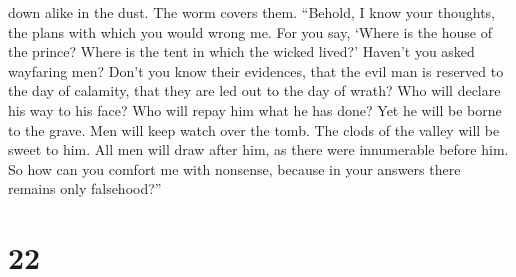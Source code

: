 down alike in the dust. The worm covers them.  ``Behold,
I know your thoughts, the plans with which you would wrong me.
 For you say, `Where is the house of the prince? Where is
the tent in which the wicked lived?'  Haven't you asked
wayfaring men? Don't you know their evidences,  that the
evil man is reserved to the day of calamity, that they are led out to
the day of wrath?  Who will declare his way to his face?
Who will repay him what he has done?  Yet he will be
borne to the grave. Men will keep watch over the tomb. 
The clods of the valley will be sweet to him. All men will draw after
him, as there were innumerable before him.  So how can
you comfort me with nonsense, because in your answers there remains only
falsehood?''

\hypertarget{section-16}{%
\section{22}\label{section-16}}

